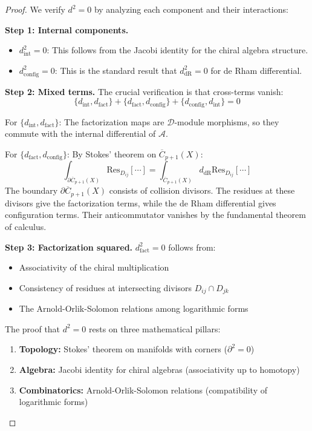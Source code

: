 \begin{proof}
We verify $d^2 = 0$ by analyzing each component and their interactions:

\textbf{Step 1: Internal components.}
\begin{itemize}
\item $d_{\text{int}}^2 = 0$: This follows from the Jacobi identity for the chiral algebra structure.
\item $d_{\text{config}}^2 = 0$: This is the standard result that $d_{\text{dR}}^2 = 0$ for de Rham differential.
\end{itemize}

\textbf{Step 2: Mixed terms.}
The crucial verification is that cross-terms vanish:
\[
\{d_{\text{int}}, d_{\text{fact}}\} + \{d_{\text{fact}}, d_{\text{config}}\} + \{d_{\text{config}}, d_{\text{int}}\} = 0
\]

For $\{d_{\text{int}}, d_{\text{fact}}\}$:
The factorization maps are $\mathcal{D}$-module morphisms, so they commute with the internal differential of $\mathcal{A}$.

For $\{d_{\text{fact}}, d_{\text{config}}\}$:
By Stokes' theorem on $\overline{C}_{p+1}(X)$:
\[
\int_{\partial \overline{C}_{p+1}(X)} \text{Res}_{D_{ij}}[\cdots] = \int_{\overline{C}_{p+1}(X)} d_{\text{dR}} \text{Res}_{D_{ij}}[\cdots]
\]
The boundary $\partial \overline{C}_{p+1}(X)$ consists of collision divisors. The residues at these divisors give the factorization terms, while the de Rham differential gives configuration terms. Their anticommutator vanishes by the fundamental theorem of calculus.

\textbf{Step 3: Factorization squared.}
$d_{\text{fact}}^2 = 0$ follows from:
\begin{itemize}
\item Associativity of the chiral multiplication
\item Consistency of residues at intersecting divisors $D_{ij} \cap D_{jk}$
\item The Arnold-Orlik-Solomon relations among logarithmic forms
\end{itemize}

\begin{remark}
The proof that $d^2 = 0$ rests on three mathematical pillars:
\begin{enumerate}
\item \textbf{Topology:} Stokes' theorem on manifolds with corners ($\partial^2 = 0$)
\item \textbf{Algebra:} Jacobi identity for chiral algebras (associativity up to homotopy)
\item \textbf{Combinatorics:} Arnold-Orlik-Solomon relations (compatibility of logarithmic forms)
\end{enumerate}


\end{remark}
\end{proof}
